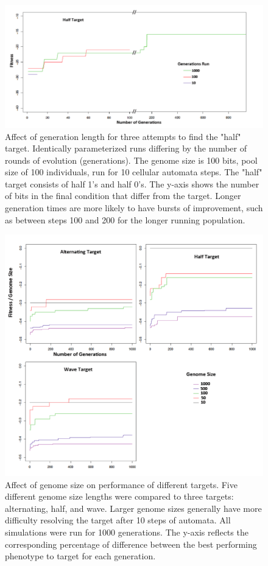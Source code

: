 \documentclass[twocolumn]{article}
\begin{document}
\begin{figure}
	\includegraphics[width=\textwidth]{figures/sim/figure_1small.pdf}
	\caption{Affect of generation length for three attempts to find the "half" target. Identically parameterized runs differing by the number of rounds of evolution (generations).  The genome size is 100 bits, pool size of 100 individuals, run for 10 cellular automata steps.  The "half" target consists of half 1's and half 0's.  The y-axis shows the number of bits in the final condition that differ from the target.  Longer generation times are more likely to have bursts of improvement, such as between steps 100 and 200 for the longer running population.
  }
	\label{fig:sim1}
\end{figure}

\begin{figure}
	\includegraphics[width=\textwidth]{figures/sim/figure_2small.pdf}
	\caption{Affect of genome size on performance of different targets.  Five different genome size lengths were compared to three targets: alternating, half, and wave.  Larger genome sizes generally have more difficulty resolving the target after 10 steps of automata.  All simulations were run for 1000 generations.  The y-axis reflects the corresponding percentage of difference between the best performing phenotype to target for each generation.
  }
	\label{fig:sim2}
\end{figure}
\end{document}
